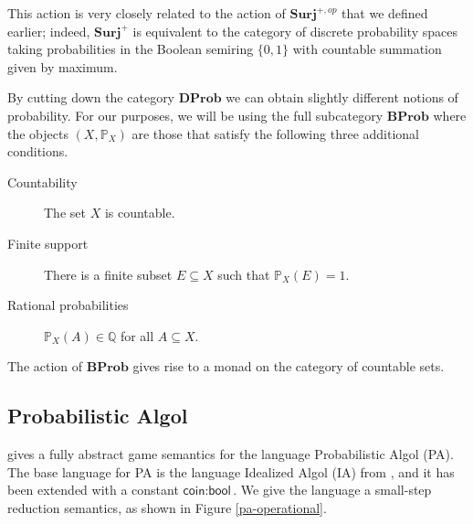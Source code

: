 \documentclass{svproc}
\newcommand*\from{\colon}
\newcommand{\0}{{\mathtt{0}}} \newcommand{\com}{{\mathtt{com}}}
\newcommand{\catname}[1]{\mathbf{#1}}
\newcommand{\Surj}{\catname{Surj}}
\newcommand{\DProb}{\catname{DProb}}
\newcommand{\BProb}{\catname{BProb}}
\newcommand{\bP}{\mathbb{P}}
\newcommand{\coin}{\textsf{coin}}
\newcommand{\bool}{\textsf{bool}}
\begin{document}
This action is very closely related to the action of $\Surj^{+,op}$ that we defined earlier; indeed, $\Surj^+$ is equivalent to the category of discrete probability spaces taking probabilities in the Boolean semiring $\{0,1\}$ with countable summation given by maximum.

By cutting down the category $\DProb$ we can obtain slightly different notions of probability.  
For our purposes, we will be using the full subcategory $\BProb$ where the objects $(X,\bP_X)$ are those that satisfy the following three additional conditions.
\begin{description}
  \item[Countability] The set $X$ is countable.
  \item[Finite support] There is a finite subset $E\subseteq X$ such that $\bP_X(E)=1$.
  \item[Rational probabilities] $\bP_X(A)\in\mathbb{Q}$ for all $A\subseteq X$.
\end{description}

The action of $\BProb$ gives rise to a monad on the category of countable sets.  

\subsection{Probabilistic Algol}

\cite{DanosHarmer} gives a fully abstract game semantics for the language Probabilistic Algol (PA).  
The base language for PA is the language Idealized Algol (IA) from \cite{SamsonGuyIAPassive}, and it has been extended with a constant $\coin\from\bool$.  
We give the language a small-step reduction semantics, as shown in Figure \ref{pa-operational}.  
\end{document}
